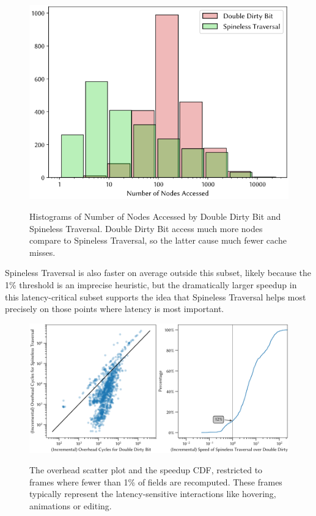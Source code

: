 \begin{figure}
    \centering
    \includegraphics[width=0.5\linewidth]{DBPQHist.png}
\label{fig:nodes-accessed}
\caption{Histograms of Number of Nodes Accessed by Double Dirty Bit and Spineless Traversal. Double Dirty Bit access much more nodes compare to Spineless Traversal, so the latter cause much fewer cache misses.}
\end{figure}

Spineless Traversal is also faster on average outside this subset,
  likely because the 1\% threshold is an imprecise heuristic,
  but the dramatically larger speedup 
  in this latency-critical subset
  supports the idea that Spineless Traversal helps most
  precisely on those points where latency is most important.

\begin{figure}
\includegraphics[scale=0.4]{DBPQSmall.png}
\begin{subfigure}{0.48\linewidth}
\end{subfigure}\hfill%
\begin{subfigure}{0.48\linewidth}
\end{subfigure}
\caption{The overhead scatter plot and the speedup CDF,
  restricted to frames where fewer than 1\% of fields
  are recomputed.
  These frames typically represent the latency-sensitive
  interactions like hovering, animations or editing.}
\label{fig:dbpq-small}
\end{figure}

